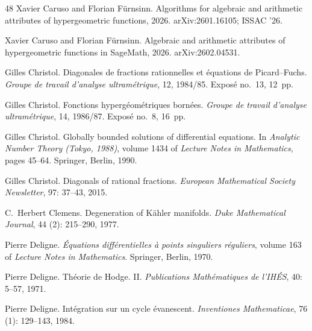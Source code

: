 \documentclass[11pt]{amsart}
\theoremstyle{definition}
\theoremstyle{remark}
\numberwithin{equation}{section}
\begin{document}
\begin{thebibliography}{48}
Xavier Caruso and Florian F{\"u}rnsinn.
\newblock Algorithms for algebraic and arithmetic attributes of hypergeometric
  functions, 2026{}.
\newblock arXiv:2601.16105; ISSAC '26.

Xavier Caruso and Florian F{\"u}rnsinn.
\newblock Algebraic and arithmetic attributes of hypergeometric functions in
  {SageMath}, 2026{}.
\newblock arXiv:2602.04531.

Gilles Christol.
\newblock Diagonales de fractions rationnelles et {\'e}quations de
  {P}icard--{F}uchs.
\newblock \emph{Groupe de travail d'analyse ultram{\'e}trique}, 12, 1984/85.
\newblock Expos{\'e} no.~13, 12~pp.

Gilles Christol.
\newblock Fonctions hyperg{\'e}om{\'e}triques born{\'e}es.
\newblock \emph{Groupe de travail d'analyse ultram{\'e}trique}, 14, 1986/87.
\newblock Expos{\'e} no.~8, 16~pp.

Gilles Christol.
\newblock Globally bounded solutions of differential equations.
\newblock In \emph{Analytic Number Theory (Tokyo, 1988)}, volume 1434 of
  \emph{Lecture Notes in Mathematics}, pages 45--64. Springer, Berlin, 1990.

Gilles Christol.
\newblock Diagonals of rational fractions.
\newblock \emph{European Mathematical Society Newsletter}, 97: 37--43,
  2015.

C.~Herbert Clemens.
\newblock Degeneration of {K}{\"a}hler manifolds.
\newblock \emph{Duke Mathematical Journal}, 44 (2): 215--290,
  1977.

Pierre Deligne.
\newblock \emph{{\'E}quations diff{\'e}rentielles {\`a} points singuliers
  r{\'e}guliers}, volume 163 of \emph{Lecture Notes in Mathematics}.
\newblock Springer, Berlin, 1970.

Pierre Deligne.
\newblock Th{\'e}orie de {H}odge. {II}.
\newblock \emph{Publications Math{\'e}matiques de l'IH{\'E}S}, 40:
  5--57, 1971.

Pierre Deligne.
\newblock Int{\'e}gration sur un cycle {\'e}vanescent.
\newblock \emph{Inventiones Mathematicae}, 76 (1): 129--143,
  1984.


\end{thebibliography}
\end{document}
